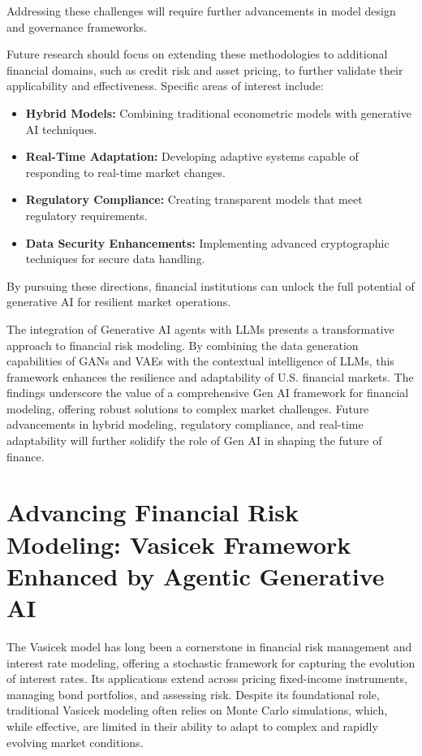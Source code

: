 \documentclass[a4paper,headinclude=on,footinclude=on,12pt,oneside]{scrbook}
\begin{document}
	Addressing these challenges will require further advancements in model design and governance frameworks.
	
	
	Future research should focus on extending these methodologies to additional financial domains, such as credit risk and asset pricing, to further validate their applicability and effectiveness. Specific areas of interest include:
	
	\begin{itemize}
		\item \textbf{Hybrid Models:} Combining traditional econometric models with generative AI techniques.
		\item \textbf{Real-Time Adaptation:} Developing adaptive systems capable of responding to real-time market changes.
		\item \textbf{Regulatory Compliance:} Creating transparent models that meet regulatory requirements.
		\item \textbf{Data Security Enhancements:} Implementing advanced cryptographic techniques for secure data handling.
	\end{itemize}
	
	By pursuing these directions, financial institutions can unlock the full potential of generative AI for resilient market operations.
	
	
	The integration of Generative AI agents with LLMs presents a transformative approach to financial risk modeling. By combining the data generation capabilities of GANs and VAEs with the contextual intelligence of LLMs, this framework enhances the resilience and adaptability of U.S. financial markets. The findings underscore the value of a comprehensive Gen AI framework for financial modeling, offering robust solutions to complex market challenges. Future advancements in hybrid modeling, regulatory compliance, and real-time adaptability will further solidify the role of Gen AI in shaping the future of finance.
	
	
	
	\chapter{Advancing Financial Risk Modeling: Vasicek Framework Enhanced by Agentic Generative AI}
	
	
	The Vasicek model has long been a cornerstone in financial risk management and interest rate modeling, offering a stochastic framework for capturing the evolution of interest rates. Its applications extend across pricing fixed-income instruments, managing bond portfolios, and assessing risk. Despite its foundational role, traditional Vasicek modeling often relies on Monte Carlo simulations, which, while effective, are limited in their ability to adapt to complex and rapidly evolving market conditions.
	
\end{document}
